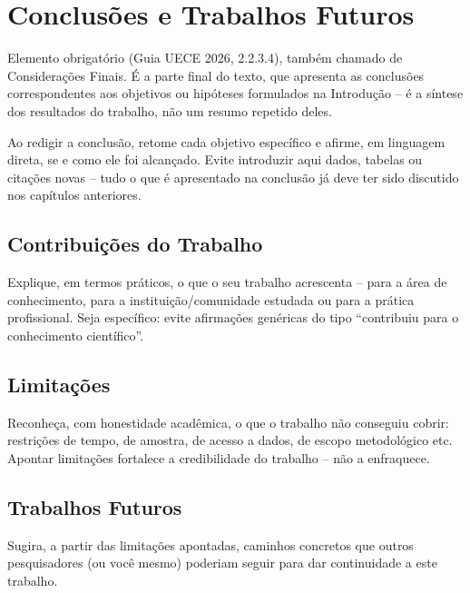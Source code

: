 \chapter{Conclusões e Trabalhos Futuros}
\label{chap:conclusoes-e-trabalhos-futuros}

Elemento obrigatório (Guia UECE 2026, 2.2.3.4), também chamado de Considerações Finais. É a parte final do texto, que apresenta as conclusões correspondentes aos objetivos ou hipóteses formulados na Introdução -- é a síntese dos resultados do trabalho, não um resumo repetido deles.

Ao redigir a conclusão, retome cada objetivo específico e afirme, em linguagem direta, se e como ele foi alcançado. Evite introduzir aqui dados, tabelas ou citações novas -- tudo o que é apresentado na conclusão já deve ter sido discutido nos capítulos anteriores.

\section{Contribuições do Trabalho}
\label{sec:contribuicoes-do-trabalho}

Explique, em termos práticos, o que o seu trabalho acrescenta -- para a área de conhecimento, para a instituição/comunidade estudada ou para a prática profissional. Seja específico: evite afirmações genéricas do tipo ``contribuiu para o conhecimento científico''.

\section{Limitações}
\label{sec:limitacoes}

Reconheça, com honestidade acadêmica, o que o trabalho não conseguiu cobrir: restrições de tempo, de amostra, de acesso a dados, de escopo metodológico etc. Apontar limitações fortalece a credibilidade do trabalho -- não a enfraquece.

\section{Trabalhos Futuros}
\label{sec:trabalhos-futuros}

Sugira, a partir das limitações apontadas, caminhos concretos que outros pesquisadores (ou você mesmo) poderiam seguir para dar continuidade a este trabalho.
